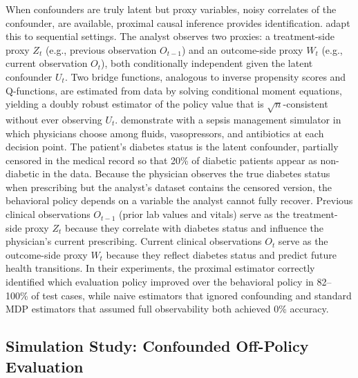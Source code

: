 When confounders are truly latent but proxy variables, noisy correlates of the confounder, are available, proximal causal inference provides identification. \citet{bennett2021proximal} adapt this to sequential settings. The analyst observes two proxies: a treatment-side proxy $Z_t$ (e.g., previous observation $O_{t-1}$) and an outcome-side proxy $W_t$ (e.g., current observation $O_t$), both conditionally independent given the latent confounder $U_t$. Two bridge functions, analogous to inverse propensity scores and Q-functions, are estimated from data by solving conditional moment equations, yielding a doubly robust estimator of the policy value that is $\sqrt{n}$-consistent without ever observing $U_t$. \citet{bennett2021proximal} demonstrate with a sepsis management simulator in which physicians choose among fluids, vasopressors, and antibiotics at each decision point. The patient's diabetes status is the latent confounder, partially censored in the medical record so that 20\% of diabetic patients appear as non-diabetic in the data. Because the physician observes the true diabetes status when prescribing but the analyst's dataset contains the censored version, the behavioral policy depends on a variable the analyst cannot fully recover. Previous clinical observations $O_{t-1}$ (prior lab values and vitals) serve as the treatment-side proxy $Z_t$ because they correlate with diabetes status and influence the physician's current prescribing. Current clinical observations $O_t$ serve as the outcome-side proxy $W_t$ because they reflect diabetes status and predict future health transitions. In their experiments, the proximal estimator correctly identified which evaluation policy improved over the behavioral policy in 82--100\% of test cases, while naive estimators that ignored confounding and standard MDP estimators that assumed full observability both achieved 0\% accuracy.

\subsection{Simulation Study: Confounded Off-Policy Evaluation}
\label{subsec:sim_confounded_ope}

